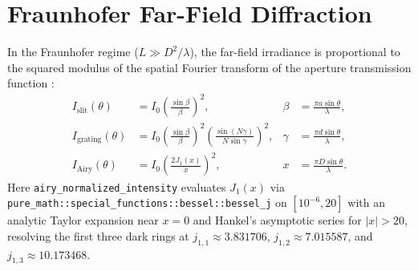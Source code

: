 \documentclass[12pt]{article}
\begin{document}
\section{Fraunhofer Far-Field Diffraction}

In the Fraunhofer regime ($L \gg D^2 / \lambda$), the far-field irradiance is proportional to the squared modulus of the spatial Fourier transform of the aperture transmission function \cite{born1999principles}:
\begin{align}
I_{\text{slit}}(\theta) &= I_0 \left(\frac{\sin\beta}{\beta}\right)^2, & \beta &= \frac{\pi a \sin\theta}{\lambda}, \\
I_{\text{grating}}(\theta) &= I_0 \left(\frac{\sin\beta}{\beta}\right)^2 \left(\frac{\sin(N\gamma)}{N\sin\gamma}\right)^2, & \gamma &= \frac{\pi d \sin\theta}{\lambda}, \\
I_{\text{Airy}}(\theta) &= I_0 \left(\frac{2 J_1(x)}{x}\right)^2, & x &= \frac{\pi D \sin\theta}{\lambda}.
\end{align}
Here \texttt{airy\_normalized\_intensity} evaluates $J_1(x)$ via \texttt{pure\_math::special\_functions::bessel::bessel\_j} on $[10^{-6}, 20]$ with an analytic Taylor expansion near $x = 0$ and Hankel's asymptotic series for $|x| > 20$, resolving the first three dark rings at $j_{1,1} \approx 3.831706$, $j_{1,2} \approx 7.015587$, and $j_{1,3} \approx 10.173468$.



\end{document}
